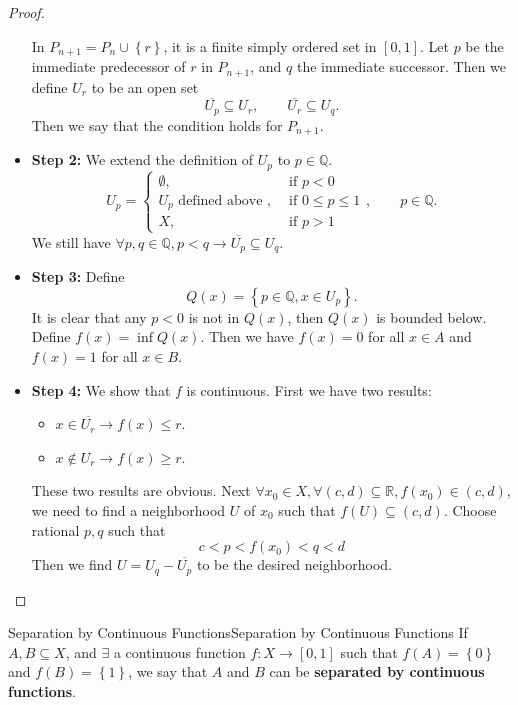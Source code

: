\documentclass[../main.tex]{subfiles}
\begin{document}
\begin{proof}
\begin{itemize}
		In $P_{n+1} = P_n \cup \left\{ r \right\}$, it is a finite simply ordered set in $[0,1]$. Let $p$ be the immediate predecessor of $r$ in $P_{n+1}$, and $q$ the immediate successor. Then we define $U_r$ to be an open set
		\begin{equation*}
			\overline{U_p} \subseteq U_r, \qquad \overline{U_r} \subseteq U_q.
		\end{equation*}
		Then we say that the condition holds for $P_{n+1}$.
	\item \textbf{Step 2: } We extend the definition of $U_p$ to $p\in \mathbb{Q}$.
		\begin{equation*}
		U_p = 
		\begin{cases}
			\emptyset , &\text{ if } p<0 \\
			U_p \text{ defined above }, &\text{ if } 0\leq p \leq 1 \\			
			X, &\text{ if } p>1
		\end{cases}
		,\qquad p\in \mathbb{Q}.
		\end{equation*}
		We still have $\forall p,q\in \mathbb{Q}, p<q \rightarrow \overline{U_p} \subseteq U_q$.
	\item \textbf{Step 3: } Define
		\begin{equation*}
		Q(x) = \left\{ p\in \mathbb{Q}, x\in U_p \right\}.
		\end{equation*}
		It is clear that any $p<0$ is not in $Q(x)$, then $Q(x)$ is bounded below. Define $f(x) = \inf Q(x)$. Then we have $f(x)=0$ for all $x\in A$ and $f(x) = 1$ for all $x\in B$.
	\item \textbf{Step 4: } We show that $f$ is continuous. First we have two results:
		\begin{itemize}
		\item $x\in \overline{U_r} \rightarrow f(x) \leq r$.
		\item $x\notin U_r \rightarrow f(x) \geq r$.
		\end{itemize}
		These two results are obvious. Next $\forall x_0\in X, \forall (c,d) \subseteq \mathbb{R}, f(x_0) \in (c,d)$, we need to find a neighborhood $U$ of $x_0$ such that $f(U) \subseteq (c,d)$. Choose rational $p,q$ such that
		\begin{equation*}
		c<p<f(x_0)<q<d
		\end{equation*}
		Then we find $U = U_q-\overline{U_p}$ to be the desired neighborhood.
	\end{itemize}
\end{proof}

\begin{definition}{Separation by Continuous Functions}{Separation by Continuous Functions}
	If $A,B \subseteq X$, and $\exists $ a continuous function $f: X \rightarrow [0,1]$ such that $f(A) = \left\{ 0 \right\}$ and $f(B) = \left\{ 1 \right\}$, we say that $A$ and $B$ can be \textbf{separated by continuous functions}.
\end{definition}
\end{document}

